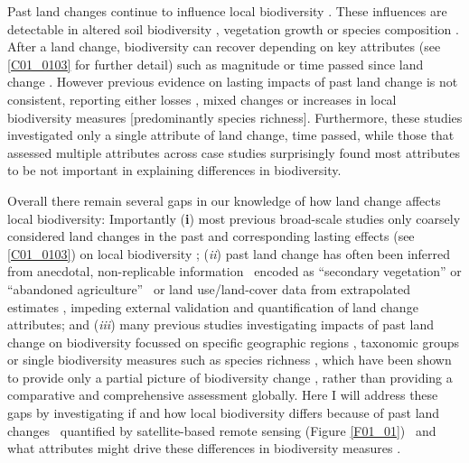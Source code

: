 Past land changes continue to influence local biodiversity \citep{Foster2003}. These influences are detectable in altered soil biodiversity \citep{Jakovac2016,Wood2017}, vegetation growth \citep{Fraterrigo2006} or species composition \citep{Bellemare2002,Ewers2013,Jakovac2016}. After a land change, biodiversity can recover \citep{Chazdon2003} depending on key attributes (see \ref{C01_0103} for further detail) such as magnitude or time passed since land change \citep{Martin2013,Fu2017,Jones2018}. However previous evidence on lasting impacts of past land change is not consistent, reporting either losses \citep{Moreno-Mateos2017,Jones2018}, mixed changes \citep{Svensson2012,Thom2016} or increases \citep{Fu2017} in local biodiversity measures [predominantly species richness]. Furthermore, these studies investigated only a single attribute of land change, \eg time passed, while those that assessed multiple attributes \citep{Shackelford2017} across case studies surprisingly found most attributes to be not important in explaining differences in biodiversity.

Overall there remain several gaps in our knowledge of how land change affects local biodiversity: Importantly (\textbf{i}) most previous broad-scale studies only coarsely considered land changes in the past \citep{Alkemade2009,Murphy2014,Newbold2015} and corresponding lasting effects (see \ref{C01_0103}) on local biodiversity \citep{Dullinger2013,Hylander2013}; (\textit{ii}) past land change has often been inferred from anecdotal, non-replicable information \textendash\ \ie encoded as “secondary vegetation” \citep{Hudson2014} or “abandoned agriculture” \citep{Gibson2011} \textendash\ or land use/land-cover data from extrapolated estimates \citep{Hurtt2011}, impeding external validation and quantification of land change attributes; and (\textit{iii}) many previous studies investigating impacts of past land change on biodiversity focussed on specific geographic regions \citep{Bellemare2002,Ewers2013,Cousins2015}, taxonomic groups \citep{Hermy2007,Perring2018} or single biodiversity measures such as species richness \citep{Martin2013,Fu2017}, which have been shown to provide only a partial picture of biodiversity change \citep{Su2004,Hillebrand2017}, rather than providing a comparative and comprehensive assessment globally. Here I will address these gaps by investigating if and how local biodiversity differs because of past land changes \textendash\ quantified by satellite-based remote sensing (Figure \ref{F01_01}) \textendash\ and what attributes might drive these differences in biodiversity measures .


